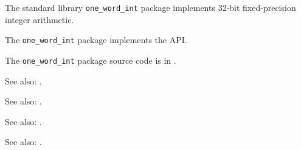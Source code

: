
The standard library {\tt one\_word\_int} package implements 32-bit fixed-precision integer arithmetic.

The {\tt one\_word\_int} package implements the  API.

The {\tt one\_word\_int} package source code is in .

See also:  .

See also:  .

See also:  .

See also:  .



